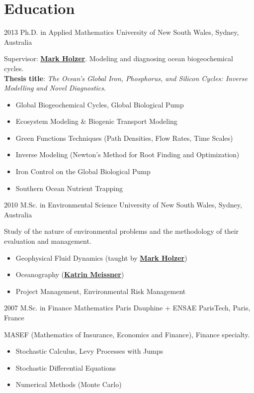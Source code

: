 \documentclass[12pt]{friggeri-cv}
\begin{document}
\newpage
\section{Education}
\begin{entrylist}
  \entry
    {2013}
    {Ph.D. in Applied Mathematics}
    {University of New South Wales, Sydney, Australia}
    {Supervisor: \hyperref[MH]{\textbf{Mark Holzer}}.
    Modeling and diagnosing ocean biogeochemical cycles.\\
    \textbf{Thesis title}: \emph{The Ocean's Global Iron, Phosphorus, and Silicon Cycles: Inverse Modelling and Novel Diagnostics}.
    \begin{itemize}
        \item Global Biogeochemical Cycles, Global Biological Pump
        \item Ecosystem Modeling \& Biogenic Transport Modeling
        \item Green Functions Techniques (Path Densities, Flow Rates, Time Scales)
        \item Inverse Modeling (Newton's Method for Root Finding and Optimization)
        \item Iron Control on the Global Biological Pump
        \item Southern Ocean Nutrient Trapping
    \end{itemize}
    }

  \entry
    {2010}
    {M.Sc. in Environmental Science}
    {University of New South Wales, Sydney, Australia}
    {Study of the nature of environmental problems and the methodology of their evaluation and management.
    \begin{itemize}
      \item Geophysical Fluid Dynamics (taught by \hyperref[MH]{\textbf{Mark Holzer}})
      \item Oceanography (\hyperref[KM]{\textbf{Katrin Meissner}})
      \item Project Management, Environmental Risk Management
    \end{itemize}
    }

  \entry
    {2007}
    {M.Sc. in Finance Mathematics}
    {Paris Dauphine + ENSAE ParisTech, Paris, France}
    {MASEF (Mathematics of Insurance, Economics and Finance), Finance specialty.
    \begin{itemize}
        \item Stochastic Calculus, Levy Processes with Jumps
        \item Stochastic Differential Equations
        \item Numerical Methods (Monte Carlo)
    \end{itemize}
    }


\end{entrylist}
\end{document}

